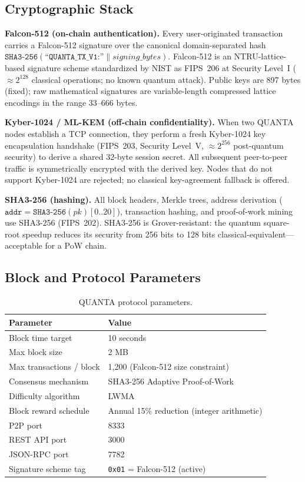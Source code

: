 \documentclass[11pt,a4paper]{article}
\begin{document}
\subsection{Cryptographic Stack}

\textbf{Falcon-512 (on-chain authentication).}
Every user-originated transaction carries a Falcon-512 signature over the
canonical domain-separated hash
$\texttt{SHA3-256}(\texttt{``QUANTA\_TX\_V1:''} \| \textit{signing\_bytes})$.
Falcon-512 is an NTRU-lattice-based signature scheme standardized by NIST as
FIPS~206 at Security Level~I ($\approx 2^{128}$ classical operations; no known
quantum attack). Public keys are 897 bytes (fixed); raw mathematical signatures are
variable-length compressed lattice encodings in the range 33--666 bytes.

\textbf{Kyber-1024 / ML-KEM (off-chain confidentiality).}
When two QUANTA nodes establish a TCP connection, they perform a fresh
Kyber-1024 key encapsulation handshake (FIPS~203, Security Level~V,
$\approx 2^{256}$ post-quantum security) to derive a shared 32-byte session
secret. All subsequent peer-to-peer traffic is symmetrically encrypted with
the derived key. Nodes that do not support Kyber-1024 are rejected; no
classical key-agreement fallback is offered.

\textbf{SHA3-256 (hashing).}
All block headers, Merkle trees, address derivation
($\texttt{addr} = \texttt{SHA3-256}(pk)[0..20]$), transaction hashing, and
proof-of-work mining use SHA3-256 (FIPS~202). SHA3-256 is Grover-resistant:
the quantum square-root speedup reduces its security from 256 bits to 128 bits
classical-equivalent---acceptable for a PoW chain.

\subsection{Block and Protocol Parameters}

\begin{table}[h]
\centering
\small
\begin{tabular}{@{}ll@{}}
\toprule
\textbf{Parameter} & \textbf{Value} \\
\midrule
Block time target        & 10 seconds \\
Max block size           & 2 MB \\
Max transactions / block & 1,200 (Falcon-512 size constraint) \\
Consensus mechanism      & SHA3-256 Adaptive Proof-of-Work \\
Difficulty algorithm     & LWMA~\cite{zawy2017} \\
Block reward schedule    & Annual 15\% reduction (integer arithmetic) \\
P2P port                 & 8333 \\
REST API port            & 3000 \\
JSON-RPC port            & 7782 \\
Signature scheme tag     & \texttt{0x01} = Falcon-512 (active) \\
\bottomrule
\end{tabular}
\caption{QUANTA protocol parameters.}
\label{tab:params}
\end{table}
\end{document}
